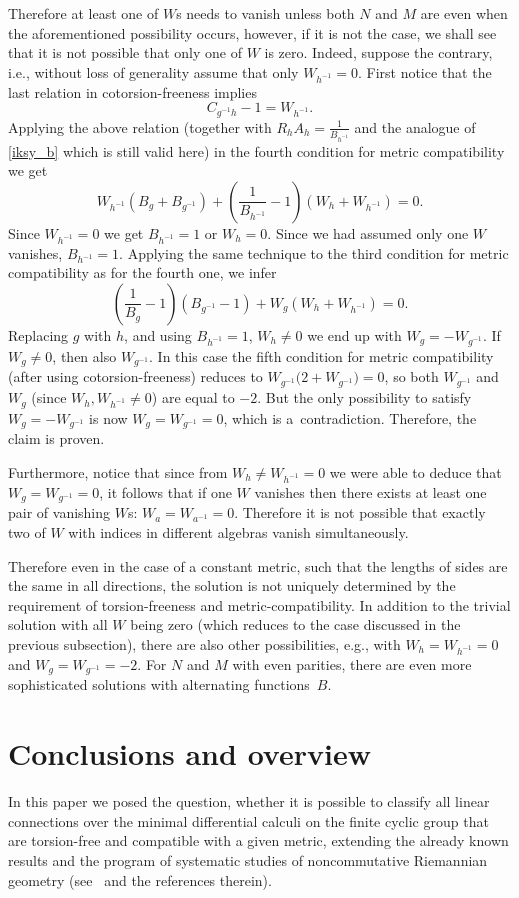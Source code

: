 \documentclass[pdftex]{sigma}
\numberwithin{equation}{section}
\begin{document}
Therefore at least one of $W$s needs to vanish unless both $N$ and $M$ are even when the aforementioned possibility occurs, however, if it is not the case, we shall see that it is not possible that only one of $W$ is zero.
Indeed, suppose the contrary, i.e., without loss of generality assume that only $W_{h^{-1}}=0$. First notice that the last
relation in cotorsion-freeness implies
\[ C_{g^{-1}h}-1=W_{h^{-1}}.\]
Applying the above relation (together with $R_hA_h=\frac{1}{B_{h^{-1}}}$ and the analogue of \eqref{iksy_b} which is still valid here) in the fourth condition for metric compatibility we get
\[ W_{h^{-1}}(B_{g}+B_{g^{-1}})+\left(\frac{1}{B_{h^{-1}}}-1\right)(W_h+W_{h^{-1}})=0.\]
Since $W_{h^{-1}}=0$ we get $B_{h^{-1}}=1$ or $W_h=0$. Since we had assumed only one $W$ vanishes, $B_{h^{-1}}=1$. Applying the same technique to the third condition for metric compatibility as for the fourth one, we infer
\[ \left(\frac{1}{B_g}-1\right)(B_{g^{-1}}-1)+W_g(W_h+W_{h^{-1}})=0.\]
Replacing $g$ with $h$, and using $B_{h^{-1}}=1$, $W_h\neq 0$ we end up with $W_g=-W_{g^{-1}}$. If $W_{g}\neq 0$, then also $W_{g^{-1}}$. In this case the fifth condition for metric compatibility (after using cotorsion-freeness) reduces to $W_{g^{-1}}\big(2+W_{g^{-1}}\big)=0$, so both $W_{g^{-1}}$ and $W_{g}$ (since $W_h,W_{h^{-1}}\neq 0$) are equal to $-2$. But the only possibility to satisfy $W_g=-W_{g^{-1}}$ is now $W_g=W_{g^{-1}}=0$, which is a~contradiction. Therefore, the claim is proven.

Furthermore, notice that since from $W_{h}\neq W_{h^{-1}}=0$ we were able to deduce that $W_g=W_{g^{-1}}=0$, it follows that if one $W$ vanishes then there exists at least one pair of vanishing $W$s: $W_a=W_{a^{-1}}=0$. Therefore it is not possible that exactly two of $W$ with indices in different algebras
vanish simultaneously.

Therefore even in the case of a constant metric, such that the lengths of sides are
the same in all directions, the solution is not uniquely determined by the requirement of torsion-freeness and metric-compatibility. In addition to the trivial solution with all $W$ being zero (which reduces to the case discussed in the previous subsection), there are also other possibilities, e.g., with $W_h=W_{h^{-1}}=0$ and $W_{g}=W_{g^{-1}}=-2$. For $N$ and $M$ with even parities, there are even more sophisticated solutions with alternating functions~$B$.

\section{Conclusions and overview}
In this paper we posed the question, whether it is possible to classify all linear connections over the minimal differential calculi on
the finite cyclic group that are torsion-free and compatible with a given metric,
extending the already known results and the program of systematic studies of
noncommutative Riemannian geometry (see~\cite{BM_book} and the references therein).
\end{document}
